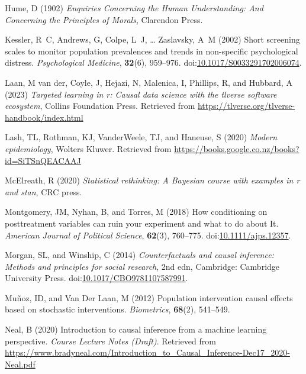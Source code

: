 \documentclass[
  single column]{article}
\newlength{\cslhangindent}
\newenvironment{CSLReferences}[2] %
 {\begin{list}{}{%
  \setlength{\itemindent}{0pt}
  \setlength{\leftmargin}{0pt}
  \setlength{\parsep}{0pt}
  \ifodd #1
   \setlength{\leftmargin}{\cslhangindent}
   \setlength{\itemindent}{-1\cslhangindent}
  \fi
  \setlength{\itemsep}{#2\baselineskip}}}
 {\end{list}}
\begin{document}
\begin{CSLReferences}{1}{0}
Hume, D (1902) \emph{Enquiries Concerning the Human Understanding: And
Concerning the Principles of Morals}, Clarendon Press.

Kessler, R~C, Andrews, G, Colpe, L~J, \ldots{} Zaslavsky, A~M (2002)
Short screening scales to monitor population prevalences and trends in
non-specific psychological distress. \emph{Psychological Medicine},
\textbf{32}(6), 959--976.
doi:\href{https://doi.org/10.1017/S0033291702006074}{10.1017/S0033291702006074}.

Laan, M van der, Coyle, J, Hejazi, N, Malenica, I, Phillips, R, and
Hubbard, A (2023) \emph{Targeted learning in r: Causal data science with
the tlverse software ecosystem}, Collins Foundation Press. Retrieved
from \url{https://tlverse.org/tlverse-handbook/index.html}

Lash, TL, Rothman, KJ, VanderWeele, TJ, and Haneuse, S (2020)
\emph{Modern epidemiology}, Wolters Kluwer. Retrieved from
\url{https://books.google.co.nz/books?id=SiTSnQEACAAJ}

McElreath, R (2020) \emph{Statistical rethinking: A {B}ayesian course
with examples in r and stan}, CRC press.

Montgomery, JM, Nyhan, B, and Torres, M (2018) How conditioning on
posttreatment variables can ruin your experiment and what to do about
It. \emph{American Journal of Political Science}, \textbf{62}(3),
760--775.
doi:\href{https://doi.org/10.1111/ajps.12357}{10.1111/ajps.12357}.

Morgan, SL, and Winship, C (2014) \emph{Counterfactuals and causal
inference: Methods and principles for social research}, 2nd edn,
Cambridge: Cambridge University Press.
doi:\href{https://doi.org/10.1017/CBO9781107587991}{10.1017/CBO9781107587991}.

Muñoz, ID, and Van Der Laan, M (2012) Population intervention causal
effects based on stochastic interventions. \emph{Biometrics},
\textbf{68}(2), 541--549.

Neal, B (2020) Introduction to causal inference from a machine learning
perspective. \emph{Course Lecture Notes (Draft)}. Retrieved from
\url{https://www.bradyneal.com/Introduction_to_Causal_Inference-Dec17_2020-Neal.pdf}


\end{CSLReferences}
\end{document}
